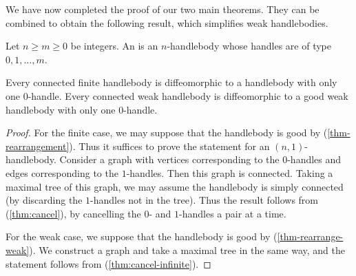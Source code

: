 We have now completed the proof of our two 
main theorems. They can be combined to obtain
the following result, which simplifies weak handlebodies.

\begin{definition}
Let $n\geq m\geq0$ be integers. An  is an $n$-handlebody
whose handles are of type $0,1,\dotsc,m$. \varqed
\end{definition}

\begin{corollary}\label{prop:0-handle}
Every connected finite handlebody is diffeomorphic to
a handlebody with only one $0$-handle.
Every connected weak handlebody is diffeomorphic to
a good weak handlebody with only one $0$-handle.
\end{corollary}

\begin{proof}
For the finite case, we may suppose that the handlebody is good by (\ref{thm-rearrangement}).
Thus it suffices to prove the statement for an $(n,1)$-handlebody.
Consider a graph with vertices corresponding to the $0$-handles
and edges corresponding to the $1$-handles.
Then this graph is connected.
Taking a maximal tree of this graph,
we may assume the handlebody is simply connected
(by discarding the $1$-handles not in the tree).
Thus the result follows from (\ref{thm:cancel}),
by cancelling the $0$- and $1$-handles a pair at a time.

For the weak case, we suppose that the handlebody is good by (\ref{thm-rearrange-weak}).
We construct a graph and take a maximal tree in the same way,
and the statement follows from (\ref{thm:cancel-infinite}).
\end{proof}
